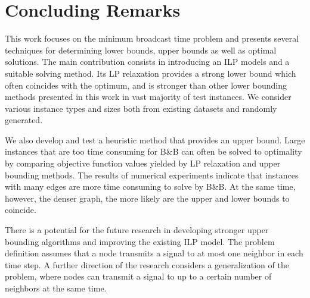\section{Concluding Remarks} \label{sec:conc}

This work focuses on the minimum broadcast time problem and presents several techniques for determining lower bounds, upper bounds as well as optimal solutions.
The main contribution consists in introducing an ILP models and a suitable solving method.
Its LP relaxation provides a strong lower bound which often coincides with the optimum, and is stronger than other lower bounding methods presented in this work in vast majority of test instances.
We consider various instance types and sizes both from existing datasets and randomly generated.

We also develop and test a heuristic method that provides an upper bound. 
Large instances that are too time consuming for B\&B can often be solved to optimality by comparing objective function values yielded by LP relaxation and upper bounding methods.
The results of numerical experiments indicate that instances with many edges are more time consuming to solve by B\&B.
At the same time, however, the denser graph, the more likely are the upper and lower bounds to coincide. 

There is a potential for the future research in developing stronger upper bounding algorithms and improving the existing ILP model.
The problem definition assumes that a node transmits a signal to at most one neighbor in each time step.
A further direction of the research considers a generalization of the problem, where nodes can transmit a signal to up to a certain number of neighbors at the same time.

